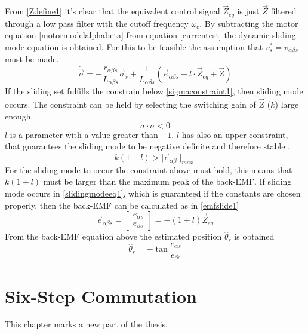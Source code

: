 \documentclass{LTHthesis}
\begin{document}
From \eqref{Zdefine1} it's clear that the equivalent control signal $ \vec{Z}_{eq}$ is just $\vec{Z}$ filtered through a low pass filter with the cutoff frequency $\omega_c$.
By subtracting the motor equation \eqref{motormodelalphabeta} from equation \eqref{currentest} the dynamic sliding mode equation is obtained. For this to be feasible the assumption that $v_s^*=v_{\alpha \beta s}$ must  be made.
\begin{equation}\label{slidingmodeeq1}
\dot{\vec{\sigma}}=-\frac{r_{\alpha \beta s}}{L_{\alpha \beta s}}\vec{\sigma}_s+ \frac{1}{L_{\alpha \beta s}}(\vec{e}_{\alpha \beta s}+l\cdot\vec{Z}_{eq}+\vec{Z})
\end{equation}
If the sliding set fulfills the constrain below \eqref{sigmaconstraint1}, then sliding mode occurs. The constraint can be held by selecting the switching gain of $\vec{Z}$ ($k$) large enough. 
\begin{equation}\label{sigmaconstraint1}
\dot{\sigma}\cdot\sigma <0
\end{equation} 
$l$ is a parameter with a value greater than $-1$. $l$ has also an upper constraint, that guarantees the sliding mode to be negative definite and therefore stable \cite{chi2007}.
\begin{equation}
k(1+l) > \mid \vec{e}_{\alpha \beta}\mid_{max}
\end{equation}
For the sliding mode to occur the constraint above must hold, this means that $k(1+l)$ must be larger than the maximum peak of the back-EMF. 
If sliding mode occurs in \eqref{slidingmodeeq1}, which is guaranteed if the constants are chosen properly, then the back-EMF can be calculated as in \eqref{emfslide1}
\begin{equation}\label{emfslide1}
\vec{e}_{\alpha \beta s}=\begin{bmatrix}
e_{\alpha s} \\ 
e_{\beta s}
\end{bmatrix}=-(1+l)\vec{Z}_{eq}
\end{equation}
From the back-EMF equation above the estimated position $\hat{\theta}_r$ is obtained
\begin{equation}
\hat{\theta}_r=-\tan\frac{e_{\alpha s}}{e_{\beta s}}
\end{equation}



\chapter{Six-Step Commutation}
This chapter marks a new part of the thesis.
\end{document}
